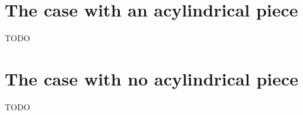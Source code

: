 \section{The case with an acylindrical piece}

TODO

\section{The case with no acylindrical piece}

TODO

